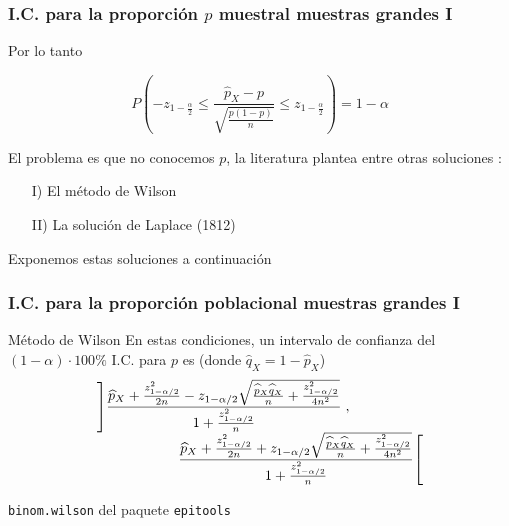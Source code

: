 \documentclass[12pt,t]{beamer}
\renewcommand{\leq}{\leqslant}
\theoremstyle{plain}
\theoremstyle{definition}
\begin{document}
\begin{frame}
\frametitle{I.C. para la proporción $p$ muestral muestras grandes I}
Por lo tanto

$$
P\left(-z_{1-\frac{\alpha}{2}}\leq \dfrac{\widehat{p}_{X}-p}
{\sqrt{\frac{p(1-p)}{n}}}\leq z_{1-\frac{\alpha}{2}}\right)=1-\alpha
$$

El problema es que no conocemos $p$, la literatura plantea entre otras soluciones :

\begin{itemize}
\item[I)] El método de Wilson
\item[II)] La solución de Laplace (1812)
\end{itemize}

Exponemos estas soluciones a continuación
\end{frame}


\begin{frame}
\frametitle{I.C. para la proporción poblacional muestras grandes I}

\begin{block}{Método de Wilson}
En estas  condiciones, un intervalo  de confianza  del $(1-\alpha)\cdot 100\%$ I.C. para $p$ es  (donde $\widehat{q}_{X}=1-\widehat{p}_{X}$)
$$
\begin{array}{l}
\displaystyle \left]\frac{\widehat{p}_{X}+\frac{z_{1-{\alpha}/{2}}^2}{2n}-z_{1-{\alpha}/{2}}\sqrt{\frac{\widehat{p}_{X}\widehat{q}_{X}}{n}+\frac{z_{1-{\alpha}/{2}}^2}{4n^2}}}{1+\frac{z_{1-{\alpha}/{2}}^2}{n}}\right.,\\[2ex]
\hspace*{2cm} \displaystyle \left.\frac{\widehat{p}_{X}+\frac{z_{1-{\alpha}/{2}}^2}{2n}+z_{1-{\alpha}/{2}}\sqrt{\frac{\widehat{p}_{X}\widehat{q}_{X}}{n}+\frac{z_{1-{\alpha}/{2}}^2}{4n^2}}}{1+\frac{z_{1-{\alpha}/{2}}^2}{n}}\right[
\end{array}
$$
\end{block}
\medskip

\texttt{binom.wilson} del paquete \texttt{epitools}
\end{frame}
\end{document}
